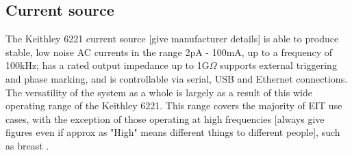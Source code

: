 \subsection{Current source}

The Keithley 6221 current source [give manufacturer details] is able to produce stable, low noise AC currents in the range 2pA - 100mA, up to a frequency of 100kHz; has a rated output impedance up to 1G\(\Omega\) supports external triggering and phase marking, and is controllable via serial, USB and Ethernet connections. The versatility of the system as a whole is largely as a result of this wide operating range of the Keithley 6221. This range covers the majority of EIT use cases, with the exception of those operating at high frequencies [always give figures even if approx as "High" means different things to different people], such as breast \cite{khan}. 